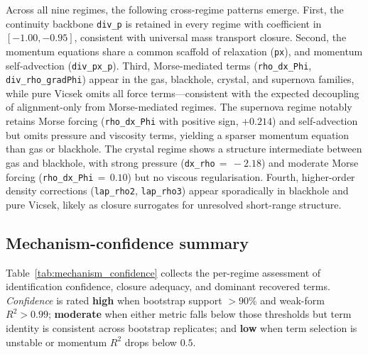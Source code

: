 Across all nine regimes, the following cross-regime patterns
emerge.  First, the continuity backbone \texttt{div\_p} is retained in
every regime with coefficient in $[-1.00, -0.95]$, consistent with
universal mass transport closure.  Second, the momentum equations share a common
scaffold of relaxation (\texttt{px}), and
momentum self-advection (\texttt{div\_px\_p}).  Third, Morse-mediated
terms (\texttt{rho\_dx\_Phi}, \texttt{div\_rho\_gradPhi}) appear
in the gas, blackhole, crystal, and supernova families, while pure Vicsek omits all
force terms---consistent with the expected decoupling of alignment-only
from Morse-mediated regimes.  The supernova regime notably retains
Morse forcing (\texttt{rho\_dx\_Phi} with positive sign, $+0.214$) and
self-advection but omits pressure and viscosity terms, yielding a sparser
momentum equation than gas or blackhole.  The crystal regime shows a
structure intermediate between gas and blackhole, with strong pressure
(\texttt{dx\_rho}$\,{=}\,{-}2.18$) and moderate Morse
forcing (\texttt{rho\_dx\_Phi}$\,{=}\,0.10$) but no viscous regularisation.
Fourth, higher-order density corrections
(\texttt{lap\_rho2}, \texttt{lap\_rho3}) appear sporadically in blackhole
and pure Vicsek, likely as closure surrogates for unresolved short-range
structure.

\subsection{Mechanism-confidence summary}
\label{subsec:mechanism_confidence}

Table~\ref{tab:mechanism_confidence} collects the per-regime assessment of
identification confidence, closure adequacy, and dominant recovered terms.
\emph{Confidence} is rated \textbf{high} when bootstrap support $>90\%$
and weak-form $R^2>0.99$; \textbf{moderate} when either metric falls below
those thresholds but term identity is consistent across bootstrap
replicates; and \textbf{low} when term selection is unstable or momentum
$R^2$ drops below $0.5$.

